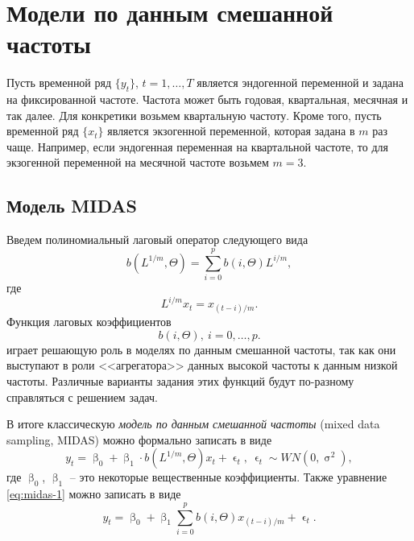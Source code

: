 \documentclass[a4paper, 14pt]{extreport}
\numberwithin{equation}{section}
\renewcommand{\beta}{\upbeta}
\renewcommand{\epsilon}{\upvarepsilon}
\renewcommand{\sigma}{\upsigma}
\numberwithin{equation}{section}
\begin{document}
	\section{Модели по данным смешанной частоты}
	
	Пусть временной ряд $\{y_t\}$, $t =1,\ldots, T$ является эндогенной переменной и задана на фиксированной частоте. Частота может быть годовая, квартальная, месячная и так далее. Для конкретики возьмем квартальную частоту. Кроме того, пусть временной ряд $\{x_t\}$ является экзогенной переменной, которая задана в $m$ раз чаще. Например, если эндогенная переменная на квартальной частоте, то для экзогенной переменной на месячной частоте возьмем $m=3$.
	
	\subsection{Модель MIDAS}
	
	Введем полиномиальный лаговый оператор следующего вида 
	\begin{equation}
		b(L^{1/m}, \Theta) = \sum_{i=0}^{p} b(i, \Theta) L^{i/m},
	\end{equation}
	где 
	\begin{equation}
		L^{i/m}x_t = x_{(t-i)/m}.
	\end{equation}
	Функция лаговых коэффициентов 
	\begin{equation}
		b(i, \Theta),\ i=0,\ldots,p.
	\end{equation} 
	играет решающую роль в моделях по данным смешанной частоты, так как они выступают в роли <<агрегатора>> данных высокой частоты к данным низкой частоты.
 	Различные варианты задания этих функций будут по-разному справляться с решением задач.
	
	В итоге классическую \textit{модель по данным смешанной частоты} (mixed data sampling, MIDAS) можно формально записать в виде
	\begin{equation}\label{eq:midas-1}
		y_t = \beta_0 + \beta_1\cdot b(L^{1/m}, \Theta) x_t + \epsilon_t,\ \epsilon_t \sim WN(0,\sigma^2),
	\end{equation}
	где $\beta_0$, $\beta_1$ -- это некоторые вещественные коэффициенты.
	Также уравнение \eqref{eq:midas-1} можно записать в виде
	\begin{equation}
		y_t = \beta_0 + \beta_1 \sum_{i=0}^{p} b(i,\Theta) x_{(t-i)/m} + \epsilon_t.
	\end{equation}
\end{document}
